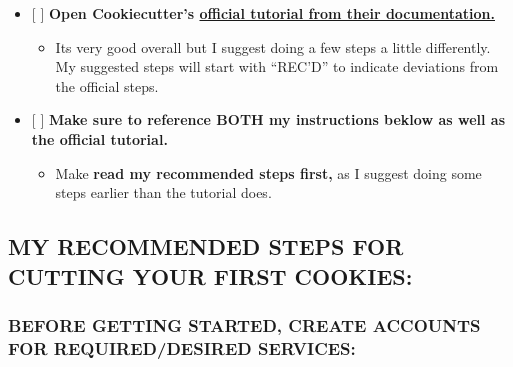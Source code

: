 \documentclass[11pt]{article}
\providecommand{\tightlist}{%
      \setlength{\itemsep}{0pt}\setlength{\parskip}{0pt}}
\begin{document}
\begin{itemize}
\tightlist
\item
  {[} {]} \textbf{Open Cookiecutter's
  \href{https://cookiecutter-pypackage.readthedocs.io/en/latest/tutorial.html}{official
  tutorial from their documentation.}}

  \begin{itemize}
  \tightlist
  \item
    Its very good overall but I suggest doing a few steps a little
    differently. My suggested steps will start with ``REC'D'' to
    indicate deviations from the official steps.
  \end{itemize}
\item
  {[} {]} \textbf{Make sure to reference BOTH my instructions beklow as
  well as the official tutorial.}

  \begin{itemize}
  \tightlist
  \item
    Make \textbf{read my recommended steps first,} as I suggest doing
    some steps earlier than the tutorial does.
  \end{itemize}
\end{itemize}

\hypertarget{my-recommended-steps-for-cutting-your-first-cookies}{%
\subsection{MY RECOMMENDED STEPS FOR CUTTING YOUR FIRST
COOKIES:}\label{my-recommended-steps-for-cutting-your-first-cookies}}

\hypertarget{before-getting-started-create-accounts-for-requireddesired-services}{%
\subsubsection{\texorpdfstring{BEFORE GETTING STARTED, CREATE ACCOUNTS
FOR REQUIRED/DESIRED
SERVICES:}{BEFORE GETTING STARTED, CREATE ACCOUNTS FOR REQUIRED/DESIRED SERVICES: }}\label{before-getting-started-create-accounts-for-requireddesired-services}}
\end{document}
